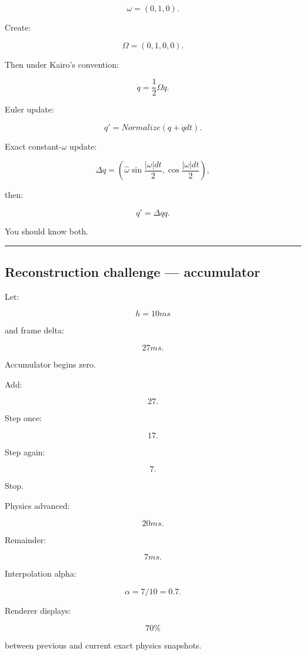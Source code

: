 \[
\omega=(0,1,0).
\]

Create:

\[
\Omega=(0,1,0,0).
\]

Then under Kairo's convention:

\[
\boxed{
\dot q
=
\frac12\Omega q.
}
\]

Euler update:

\[
q'
=
Normalize(
q+\dot qdt
).
\]

Exact constant-\(\omega\) update:

\[
\Delta q
=
\left(
\hat\omega
\sin\frac{|\omega|dt}{2},
\cos\frac{|\omega|dt}{2}
\right),
\]

then:

\[
q'
=
\Delta q q.
\]

You should know both.

\begin{center}\rule{0.5\linewidth}{0.5pt}\end{center}

\subsection{Reconstruction challenge --- accumulator}\label{06-engine-ii-ch038-reconstruction-challenge-accumulator}

\hypertarget{06-engine-ii-ch038-reconstruction-challenge-accumulator}{}

Let:

\[
h=10ms
\]

and frame delta:

\[
27ms.
\]

Accumulator begins zero.

Add:

\[
27.
\]

Step once:

\[
17.
\]

Step again:

\[
7.
\]

Stop.

Physics advanced:

\[
20ms.
\]

Remainder:

\[
7ms.
\]

Interpolation alpha:

\[
\alpha
=
7/10
=
0.7.
\]

Renderer displays:

\[
70\%
\]

between previous and current exact physics snapshots.

